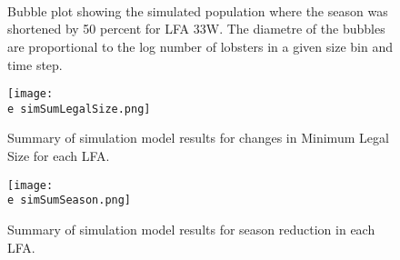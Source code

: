 \documentclass[11pt]{article}
\newcommand{\e}{\string~/bio.data/bio.lobster/figures/LFA2733Framework2018/} %
\begin{document}
    \begin{figure}
    \centering
                \\
                \\
                \\
        
         \caption{Bubble plot showing the simulated population where the season was shortened by 50 percent  for LFA 33W. The diametre of the bubbles are proportional to the log number of lobsters in a given size bin and time step.}
    \end{figure}
    

    \begin{figure}
    \centering
        \texttt{[image: \\e simSumLegalSize.png]}
        \caption{Summary of simulation model results for changes in Minimum Legal Size for each LFA.}

    \end{figure}

    \begin{figure}
    \centering
        \texttt{[image: \\e simSumSeason.png]}
        \caption{Summary of simulation model results for season reduction in each LFA.}   

    \end{figure}    


  
\end{document}
